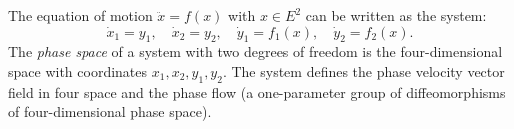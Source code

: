 The equation of motion $\ddot{x} = f(x)$ with $x \in E^2$ can be written as the system:
$$\dot{x}_1 = y_1, \quad \dot{x}_2 = y_2, \quad \dot{y}_1 = f_1(x), \quad \dot{y}_2 = f_2(x).$$
The \textit{phase space} of a system with two degrees of freedom is the four-dimensional space with coordinates $x_1, x_2, y_1, y_2$.
The system defines the phase velocity vector field in four space and the phase flow (a one-parameter group of diffeomorphisms of four-dimensional phase space).
